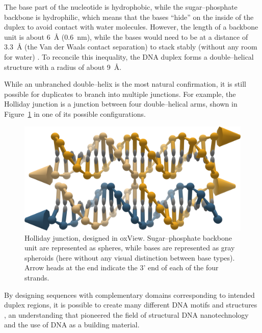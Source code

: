 The base part of the nucleotide is hydrophobic, while the sugar--phosphate backbone is hydrophilic, which means that the bases ``hide'' on the inside of the duplex to avoid contact with water molecules. However, the length of a backbone unit is about 6~Å (0.6~nm), while the bases would need to be at a distance of 3.3~Å (the Van der Waals contact separation) to stack stably (without any room for water) \cite{calladine1997understanding}. To reconcile this inequality, the DNA duplex forms a double--helical structure with a radius of about 9~Å.

While an unbranched double--helix is the most natural confirmation, it is still possible for duplicates to branch into multiple junctions. For example, the Holliday junction is a junction between four double--helical arms, shown in Figure~\ref{fig:holliday} in one of its possible configurations.

\begin{figure}
    \centering\includegraphics[width=\textwidth]{figures/holliday.png}
    \caption{Holliday junction, designed in oxView. Sugar--phosphate backbone unit are represented as spheres, while bases are represented as gray spheroids (here without any visual distinction between base types). Arrow heads at the end indicate the 3' end of each of the four strands.}
    \label{fig:holliday}
\end{figure}



By designing sequences with complementary domains corresponding to intended duplex regions, it is possible to create many different DNA motifs and structures \cite{seeman_2016, Seeman1982}, an understanding that pioneered the field of structural DNA nanotechnology and the use of DNA as a building material.

